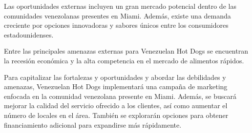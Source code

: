 Las oportunidades externas incluyen un gran mercado potencial dentro de las comunidades venezolanas presentes en Miami. Además, existe una demanda creciente por opciones innovadoras y sabores únicos entre los consumidores estadounidenses.

Entre las principales amenazas externas para Venezuelan Hot Dogs se encuentran la recesión económica y la alta competencia en el mercado de alimentos rápidos.

Para capitalizar las fortalezas y oportunidades y abordar las debilidades y amenazas, Venezuelan Hot Dogs implementará una campaña de marketing enfocada en la comunidad venezolana presente en Miami. Además, se buscará mejorar la calidad del servicio ofrecido a los clientes, así como aumentar el número de locales en el área. También se explorarán opciones para obtener financiamiento adicional para expandirse más rápidamente.